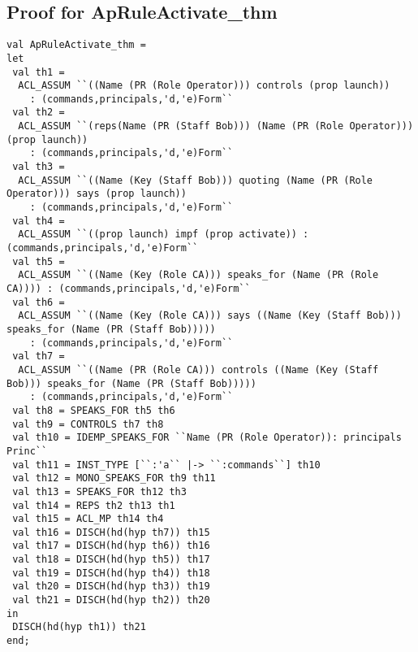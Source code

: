 \documentclass{report}
\begin{document}
\subsection{Proof for ApRuleActivate_thm}
\label{proof-14-3}
\begin{lstlisting}[frame=TBlr]
val ApRuleActivate_thm =
let
 val th1 = 
  ACL_ASSUM ``((Name (PR (Role Operator))) controls (prop launch))
    : (commands,principals,'d,'e)Form``
 val th2 = 
  ACL_ASSUM ``(reps(Name (PR (Staff Bob))) (Name (PR (Role Operator))) (prop launch))
    : (commands,principals,'d,'e)Form``
 val th3 = 
  ACL_ASSUM ``((Name (Key (Staff Bob))) quoting (Name (PR (Role Operator))) says (prop launch))
    : (commands,principals,'d,'e)Form``
 val th4 =
  ACL_ASSUM ``((prop launch) impf (prop activate)) : (commands,principals,'d,'e)Form``
 val th5 = 
  ACL_ASSUM ``((Name (Key (Role CA))) speaks_for (Name (PR (Role CA)))) : (commands,principals,'d,'e)Form``
 val th6 = 
  ACL_ASSUM ``((Name (Key (Role CA))) says ((Name (Key (Staff Bob))) speaks_for (Name (PR (Staff Bob)))))
    : (commands,principals,'d,'e)Form``
 val th7 = 
  ACL_ASSUM ``((Name (PR (Role CA))) controls ((Name (Key (Staff Bob))) speaks_for (Name (PR (Staff Bob)))))
    : (commands,principals,'d,'e)Form``
 val th8 = SPEAKS_FOR th5 th6
 val th9 = CONTROLS th7 th8
 val th10 = IDEMP_SPEAKS_FOR ``Name (PR (Role Operator)): principals Princ``
 val th11 = INST_TYPE [``:'a`` |-> ``:commands``] th10
 val th12 = MONO_SPEAKS_FOR th9 th11
 val th13 = SPEAKS_FOR th12 th3
 val th14 = REPS th2 th13 th1
 val th15 = ACL_MP th14 th4
 val th16 = DISCH(hd(hyp th7)) th15
 val th17 = DISCH(hd(hyp th6)) th16
 val th18 = DISCH(hd(hyp th5)) th17
 val th19 = DISCH(hd(hyp th4)) th18
 val th20 = DISCH(hd(hyp th3)) th19
 val th21 = DISCH(hd(hyp th2)) th20
in
 DISCH(hd(hyp th1)) th21
end;

\end{lstlisting}
\end{document}
